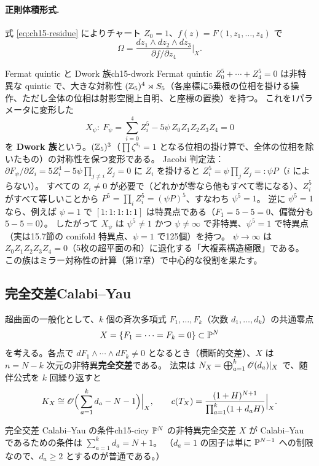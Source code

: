 \paragraph{正則体積形式.}
式 \eqref{eq:ch15-residue} によりチャート $Z_0=1$、$f(z) = F(1,z_1,\dots,z_4)$ で
\[
\Omega = \frac{dz_1\wedge dz_2\wedge dz_3}{\partial f/\partial z_4}\Big|_X .
\]

\begin{myex}{Fermat quintic と Dwork 族}{ch15-dwork}
Fermat quintic $Z_0^5+\cdots+Z_4^5 = 0$ は非特異な quintic で、大きな対称性
$(\mathbb{Z}_5)^4\rtimes S_5$（各座標に5乗根の位相を掛ける操作、ただし全体の位相は射影空間上自明、と座標の置換）を持つ。
これを1パラメータに変形した
\[
X_\psi :\ F_\psi = \sum_{i=0}^4Z_i^5 - 5\psi\,Z_0Z_1Z_2Z_3Z_4 = 0
\]
を \textbf{Dwork 族}という。$(\mathbb{Z}_5)^3$（$\prod\zeta^{a_i}=1$ となる位相の掛け算で、全体の位相を除いたもの）の対称性を保つ変形である。
Jacobi 判定法：$\partial F_\psi/\partial Z_i = 5Z_i^4 - 5\psi\prod_{j\ne i}Z_j = 0$ に $Z_i$ を掛けると $Z_i^5 = \psi\prod_jZ_j =: \psi P$（$i$ によらない）。
すべての $Z_i\neq 0$ が必要で（どれかが零なら他もすべて零になる）、$Z_i^5$ がすべて等しいことから $P^5 = \prod_i Z_i^5 = (\psi P)^5$、すなわち $\psi^5 = 1$。
逆に $\psi^5 = 1$ なら、例えば $\psi = 1$ で $[1:1:1:1:1]$ は特異点である（$F_1 = 5 - 5 = 0$、偏微分も $5-5 = 0$）。
したがって $X_\psi$ は $\psi^5\neq1$ かつ $\psi\neq\infty$ で非特異、$\psi^5 = 1$ で特異点（実は15.7節の conifold 特異点、$\psi=1$ で125個）を持つ。
$\psi\to\infty$ は $Z_0Z_1Z_2Z_3Z_4=0$（5枚の超平面の和）に退化する「大複素構造極限」である。
この族はミラー対称性の計算（第17章）で中心的な役割を果たす。
\end{myex}

\subsection{完全交差Calabi--Yau}

超曲面の一般化として、$k$ 個の斉次多項式 $F_1,\dots,F_k$（次数 $d_1,\dots,d_k$）の共通零点
\[
X = \{F_1 = \cdots = F_k = 0\}\subset\mathbb{P}^N
\]
を考える。各点で $dF_1\wedge\cdots\wedge dF_k\neq0$ となるとき（横断的交差）、$X$ は $n = N-k$ 次元の非特異\textbf{完全交差}である。
法束は $N_X = \bigoplus_{a=1}^k\mathscr{O}(d_a)|_X$ で、随伴公式を $k$ 回繰り返すと
\[
K_X\cong\mathscr{O}\Big(\sum_{a=1}^kd_a - N - 1\Big)\Big|_X,\qquad
c(T_X) = \frac{(1+H)^{N+1}}{\prod_{a=1}^k(1+d_aH)}\Big|_X .
\]

\begin{mycor}{完全交差 Calabi--Yau の条件}{ch15-cicy}
$\mathbb{P}^N$ の非特異完全交差 $X$ が Calabi--Yau であるための条件は $\displaystyle\sum_{a=1}^kd_a = N+1$。
（$d_a = 1$ の因子は単に $\mathbb{P}^{N-1}$ への制限なので、$d_a\geq2$ とするのが普通である。）
\end{mycor}

